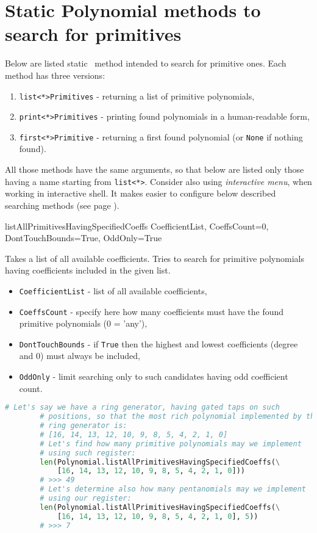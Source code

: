 \section{Static Polynomial methods to search for primitives}

Below are listed static \Polynomial\ method intended to search for primitive ones.
Each method has three versions:
\begin{enumerate}
	\item \texttt{list<*>Primitives} - returning a list of primitive polynomials,
	\item \texttt{print<*>Primitives} - printing found polynomials in a human-readable form,
	\item \texttt{first<*>Primitive} - returning a first found polynomial (or \texttt{None} if nothing found).
\end{enumerate}
All those methods have the same arguments, so that below are listed only those having a name starting from \texttt{list<*>}.
Consider also using \textit{interactive menu}, when working in interactive shell. It makes easier to configure below described searching methods (see page \pageref{menu}).

 {listAllPrimitivesHavingSpecifiedCoeffs} {CoefficientList, CoeffsCount=0,\\DontTouchBounds=True, OddOnly=True} {
	Takes a list of all available coefficients. Tries to search for primitive polynomials having coefficients included in the given list.
	\begin{itemize}
		\item \texttt{CoefficientList} - list of all available coefficients,
		\item \texttt{CoeffsCount} - specify here how many coefficients must have the found primitive polynomials (0 = 'any'),
		\item \texttt{DontTouchBounds} - if \texttt{True} then the highest and lowest coefficients (degree and 0) must always be included,
		\item \texttt{OddOnly} - limit searching only to such candidates having odd coefficient count.
	\end{itemize}
}
\begin{lstlisting}[language=Python]
		# Let's say we have a ring generator, having gated taps on such 
		# positions, so that the most rich polynomial implemented by thus
		# ring generator is:
		# [16, 14, 13, 12, 10, 9, 8, 5, 4, 2, 1, 0]
		# Let's find how many primitive polynomials may we implement
		# using such register:
		len(Polynomial.listAllPrimitivesHavingSpecifiedCoeffs(\
			[16, 14, 13, 12, 10, 9, 8, 5, 4, 2, 1, 0]))
		# >>> 49
		# Let's determine also how many pentanomials may we implement
		# using our register:
		len(Polynomial.listAllPrimitivesHavingSpecifiedCoeffs(\
			[16, 14, 13, 12, 10, 9, 8, 5, 4, 2, 1, 0], 5))
		# >>> 7
\end{lstlisting}

